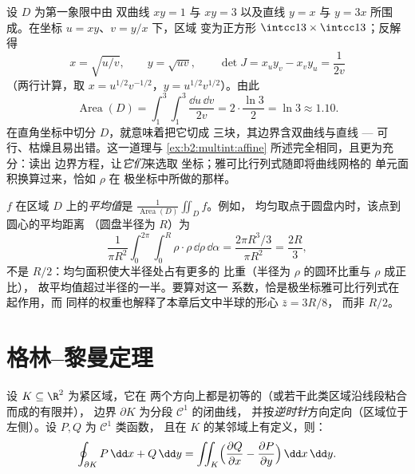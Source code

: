 \begin{example}[适应曲线型区域的
坐标]\label{ex:b2:multint:hyperbolicregion}
设 $D$ 为第一象限中由
双曲线 $xy = 1$ 与 $xy = 3$ 以及直线 $y = x$ 与
$y = 3x$ 所围成。在坐标 $u = xy$、$v = y/x$ 下，区域
变为正方形 $\intcc13 \times \intcc13$；反解得
\[
x = \sqrt{u/v}, \qquad y = \sqrt{uv},
\qquad
\det J = x_uy_v - x_vy_u = \frac{1}{2v}
\]
（两行计算，取 $x = u^{1/2}v^{-1/2}$，$y =
u^{1/2}v^{1/2}$）。由此
\[
\operatorname{Area}(D)
= \int_1^3\!\!\int_1^3\frac{\dd u\,\dd v}{2v}
= 2\cdot\frac{\ln 3}{2} = \ln 3 \approx 1.10 .
\]
在直角坐标中切分 $D$，就意味着把它切成
三块，其边界含双曲线与直线 ---
可行、枯燥且易出错。这一道理与
\cref{ex:b2:multint:affine} 所述完全相同，且更为充分：读出
边界方程，让\emph{它们}来选取
坐标；雅可比行列式随即将曲线网格的
单元面积换算过来，恰如 $\rho$ 在
极坐标中所做的那样。
\end{example}

\begin{example}[平均值]\label{ex:b2:multint:average}
$f$ 在区域 $D$ 上的\emph{平均值}是
$\frac1{\operatorname{Area}(D)}\iint_Df$。例如，
均匀取点于圆盘内时，该点到圆心的平均距离
（圆盘半径为 $R$）为
\[
\frac{1}{\pi R^2}\int_0^{2\pi}\!\!\int_0^R
\rho\cdot\rho\,\dd\rho\,\dd\alpha
= \frac{2\pi R^3/3}{\pi R^2} = \frac{2R}3 ,
\]
不是 $R/2$：均匀面积使大半径处占有更多的
比重（半径为 $\rho$ 的圆环比重与 $\rho$ 成正比），
故平均值超过半径的一半。要算对这一
系数，恰是极坐标雅可比行列式在起作用，而
同样的权重也解释了本章后文中半球的形心 $\bar z = 3R/8$，
而非 $R/2$。
\end{example}

\section{格林--黎曼定理}

\begin{theorem}[格林--黎曼]\label{thm:b2:multint:green}
设 $K \subseteq \R^2$ 为紧区域，它在
两个方向上都是初等的（或若干此类区域沿线段粘合而成的有限并），
边界 $\partial K$ 为分段 $\mathcal{C}^1$ 的闭曲线，
并按\emph{逆时针}方向定向（区域位于
左侧）。设 $P, Q$ 为 $\mathcal{C}^1$ 类函数，
且在 $K$ 的某邻域上有定义，则：
\[
\oint_{\partial K} P\,\dd x + Q\,\dd y
= \iint_K \Bigl(\frac{\partial Q}{\partial x}
- \frac{\partial P}{\partial y}\Bigr)\,\dd x\,\dd y .
\]
\end{theorem}


